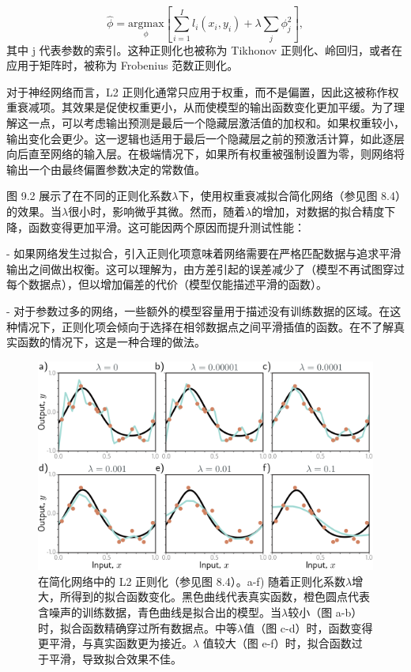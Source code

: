 \begin{equation}
\hat{\phi} = \underset{\phi}{\mathrm{argmax}} \left[ \sum_{i=1}^I l_i(x_i, y_i) + \lambda \sum_j \phi_j^2 \right], 
\end{equation}
其中 j 代表参数的索引。这种正则化也被称为 Tikhonov 正则化、岭回归，或者在应用于矩阵时，被称为 Frobenius 范数正则化。

对于神经网络而言，L2 正则化通常只应用于权重，而不是偏置，因此这被称作权重衰减项。其效果是促使权重更小，从而使模型的输出函数变化更加平缓。为了理解这一点，可以考虑输出预测是最后一个隐藏层激活值的加权和。如果权重较小，输出变化会更少。这一逻辑也适用于最后一个隐藏层之前的预激活计算，如此逐层向后直至网络的输入层。在极端情况下，如果所有权重被强制设置为零，则网络将输出一个由最终偏置参数决定的常数值。

图 9.2 展示了在不同的正则化系数\(\lambda\)下，使用权重衰减拟合简化网络（参见图 8.4）的效果。当\(\lambda\)很小时，影响微乎其微。然而，随着\(\lambda\)的增加，对数据的拟合精度下降，函数变得更加平滑。这可能因两个原因而提升测试性能：

- 如果网络发生过拟合，引入正则化项意味着网络需要在严格匹配数据与追求平滑输出之间做出权衡。这可以理解为，由方差引起的误差减少了（模型不再试图穿过每个数据点），但以增加偏差的代价（模型仅能描述平滑的函数）。

- 对于参数过多的网络，一些额外的模型容量用于描述没有训练数据的区域。在这种情况下，正则化项会倾向于选择在相邻数据点之间平滑插值的函数。在不了解真实函数的情况下，这是一种合理的做法。

\begin{figure}[ht!]
	\centering
	\includegraphics[width=0.7\linewidth]{png/chapter9/RegExplicitPractice.png}
	\caption{在简化网络中的 L2 正则化（参见图 8.4）。a-f) 随着正则化系数\(\lambda\)增大，所得到的拟合函数变化。黑色曲线代表真实函数，橙色圆点代表含噪声的训练数据，青色曲线是拟合出的模型。当\(\lambda\)较小（图 a-b）时，拟合函数精确穿过所有数据点。中等\(\lambda\)值（图 c-d）时，函数变得更平滑，与真实函数更为接近。\(\lambda\) 值较大（图 e-f）时，拟合函数过于平滑，导致拟合效果不佳。}
\end{figure}

